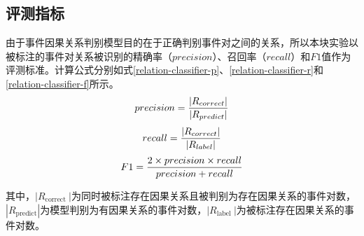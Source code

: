 \subsection{评测指标}
由于事件因果关系判别模型目的在于正确判别事件对之间的关系，所以本块实验以被标注的事件对关系被识别的精确率（$precision$）、召回率（$recall$）和$F1$值作为评测标准。计算公式分别如式\ref{relation-classifier-p}、\ref{relation-classifier-r}和\ref{relation-classifier-f}所示。
\begin{equation}
    \centering
    precision =\frac{\left|R_{correct }\right|}{|R_{predict}|}
    \label{relation-classifier-p}
\end{equation}
\begin{equation}
    \centering
    recall =\frac{\left|R_{correct }\right|}{\left|R_{label }\right|}
    \label{relation-classifier-r}
\end{equation}
\begin{equation}
    \centering
    F 1=\frac{2 \times  precision  \times  recall }{precision + recall }
    \label{relation-classifier-f}
\end{equation}

其中，$\left|R_{\text {correct }}\right|$为同时被标注存在因果关系且被判别为存在因果关系的事件对数，$|R_{\text {predict}}|$为模型判别为有因果关系的事件对数，$\left|R_{\text {label }}\right|$为被标注存在因果关系的事件对数。

